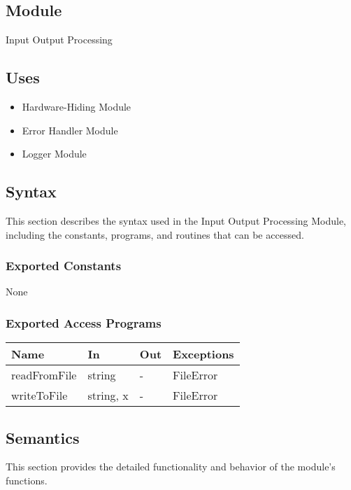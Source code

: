 \documentclass[12pt, titlepage]{article}
\begin{document}
\subsection{Module}

Input Output Processing

\subsection{Uses}

\begin{itemize}
\item Hardware-Hiding Module
\item Error Handler Module
\item Logger Module
\end{itemize}

\subsection{Syntax}

This section describes the syntax used in the Input Output Processing Module,
including the constants, programs, and routines that can be accessed.

\subsubsection{Exported Constants}

None

\subsubsection{Exported Access Programs}

\begin{center}
\begin{tabular}{p{3cm} p{4cm} p{4cm} p{2cm}}
\hline
\textbf{Name} & \textbf{In} & \textbf{Out} & \textbf{Exceptions} \\
\hline
readFromFile & string & - & FileError \\
writeToFile & string, x & - & FileError \\
\hline
\end{tabular}
\end{center}

\subsection{Semantics}

This section provides the detailed functionality and behavior of the module’s
functions.
\end{document}
